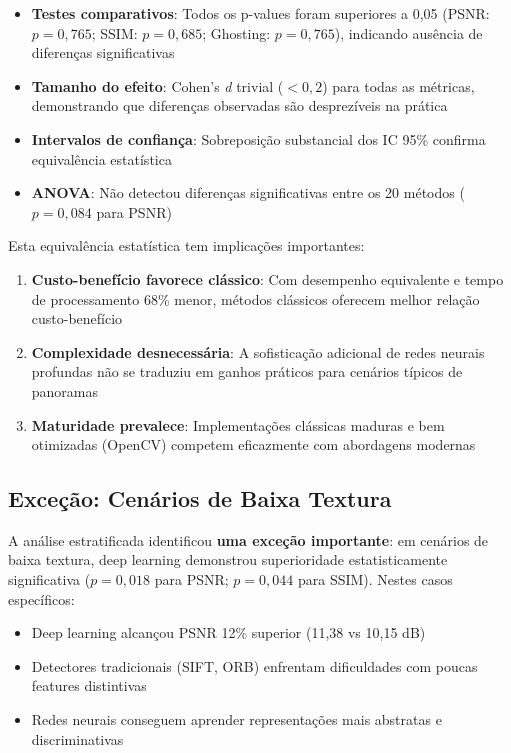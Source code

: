 \begin{itemize}
    \item \textbf{Testes comparativos}: Todos os p-values foram superiores a 0,05 (PSNR: $p=0{,}765$; SSIM: $p=0{,}685$; Ghosting: $p=0{,}765$), indicando ausência de diferenças significativas
    \item \textbf{Tamanho do efeito}: Cohen's \textit{d} trivial ($<0{,}2$) para todas as métricas, demonstrando que diferenças observadas são desprezíveis na prática
    \item \textbf{Intervalos de confiança}: Sobreposição substancial dos IC 95\% confirma equivalência estatística
    \item \textbf{ANOVA}: Não detectou diferenças significativas entre os 20 métodos ($p=0{,}084$ para PSNR)
\end{itemize}

Esta equivalência estatística tem implicações importantes:

\begin{enumerate}
    \item \textbf{Custo-benefício favorece clássico}: Com desempenho equivalente e tempo de processamento 68\% menor, métodos clássicos oferecem melhor relação custo-benefício
    \item \textbf{Complexidade desnecessária}: A sofisticação adicional de redes neurais profundas não se traduziu em ganhos práticos para cenários típicos de panoramas
    \item \textbf{Maturidade prevalece}: Implementações clássicas maduras e bem otimizadas (OpenCV) competem eficazmente com abordagens modernas
\end{enumerate}

\subsection{Exceção: Cenários de Baixa Textura}

A análise estratificada identificou \textbf{uma exceção importante}: em cenários de baixa textura, deep learning demonstrou superioridade estatisticamente significativa ($p=0{,}018$ para PSNR; $p=0{,}044$ para SSIM). Nestes casos específicos:

\begin{itemize}
    \item Deep learning alcançou PSNR 12\% superior (11,38 vs 10,15 dB)
    \item Detectores tradicionais (SIFT, ORB) enfrentam dificuldades com poucas features distintivas
    \item Redes neurais conseguem aprender representações mais abstratas e discriminativas
\end{itemize}

